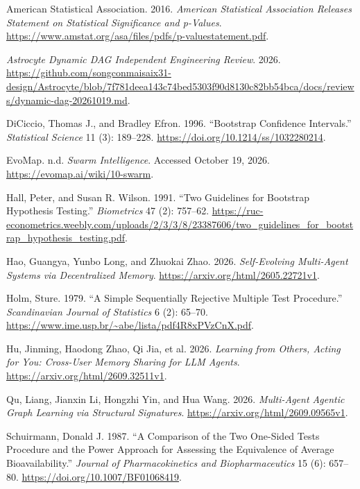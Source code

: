 \documentclass[
  english,
  11pt,
]{article}
\newlength{\cslhangindent}
\newenvironment{CSLReferences}[2] %
 {\begin{list}{}{%
  \setlength{\itemindent}{0pt}
  \setlength{\leftmargin}{0pt}
  \setlength{\parsep}{0pt}
  \ifodd #1
   \setlength{\leftmargin}{\cslhangindent}
   \setlength{\itemindent}{-1\cslhangindent}
  \fi
  \setlength{\itemsep}{#2\baselineskip}}}
 {\end{list}}
\begin{document}
\protect{}\label{refs}
\begin{CSLReferences}{1}{1}
American Statistical Association. 2016. \emph{American Statistical
Association Releases Statement on Statistical Significance and
p-Values}.
\url{https://www.amstat.org/asa/files/pdfs/p-valuestatement.pdf}.

\emph{Astrocyte Dynamic {DAG} Independent Engineering Review}. 2026.
\url{https://github.com/songconmaisaix31-design/Astrocyte/blob/7f781deea143c74bed5303f90d8130c82bb54bca/docs/reviews/dynamic-dag-20261019.md}.

DiCiccio, Thomas J., and Bradley Efron. 1996. {``Bootstrap Confidence
Intervals.''} \emph{Statistical Science} 11 (3): 189--228.
\url{https://doi.org/10.1214/ss/1032280214}.

EvoMap. n.d. \emph{Swarm Intelligence}. Accessed October 19, 2026.
\url{https://evomap.ai/wiki/10-swarm}.

Hall, Peter, and Susan R. Wilson. 1991. {``Two Guidelines for Bootstrap
Hypothesis Testing.''} \emph{Biometrics} 47 (2): 757--62.
\url{https://ruc-econometrics.weebly.com/uploads/2/3/3/8/23387606/two_guidelines_for_bootstrap_hypothesis_testing.pdf}.

Hao, Guangya, Yunbo Long, and Zhuokai Zhao. 2026. \emph{Self-Evolving
Multi-Agent Systems via Decentralized Memory}.
\url{https://arxiv.org/html/2605.22721v1}.

Holm, Sture. 1979. {``A Simple Sequentially Rejective Multiple Test
Procedure.''} \emph{Scandinavian Journal of Statistics} 6 (2): 65--70.
\url{https://www.ime.usp.br/~abe/lista/pdf4R8xPVzCnX.pdf}.

Hu, Jinming, Haodong Zhao, Qi Jia, et al. 2026. \emph{Learning from
Others, Acting for You: Cross-User Memory Sharing for {LLM} Agents}.
\url{https://arxiv.org/html/2609.32511v1}.

Qu, Liang, Jianxin Li, Hongzhi Yin, and Hua Wang. 2026.
\emph{Multi-Agent Agentic Graph Learning via Structural Signatures}.
\url{https://arxiv.org/html/2609.09565v1}.

Schuirmann, Donald J. 1987. {``A Comparison of the Two One-Sided Tests
Procedure and the Power Approach for Assessing the Equivalence of
Average Bioavailability.''} \emph{Journal of Pharmacokinetics and
Biopharmaceutics} 15 (6): 657--80.
\url{https://doi.org/10.1007/BF01068419}.


\end{CSLReferences}
\end{document}
